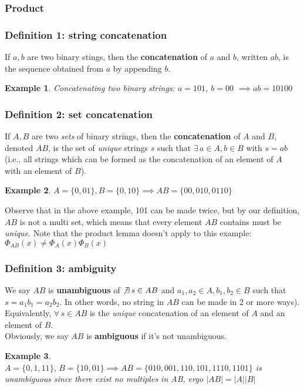 \documentclass{report}
\newtheorem{ex}{Example}[section]
\begin{document}
\subsubsection{Product}
\subsubsection{Definition 1: string concatenation}
If $a, b$ are two binary stings, then the \textbf{concatenation} of $a$ and $b$, written $ab$, is the sequence obtained from $a$ by appending $b$.
\begin{ex}
Concatenating two binary strings: $a = 101$, $b = 00$ $\implies ab = 10100$
\end{ex}
\subsubsection{Definition 2: set concatenation}
If $A, B$ are two \textit{sets} of binary strings, then the \textbf{concatenation} of $A$ and $B$, denoted $AB$, is the set of \textit{unique} strings $s$ such that $\exists\, a\in A, b \in B$ with $s = ab$ (i.e., all strings which can be formed as the concatenation of an element of $A$ with an element of $B$).
\begin{ex}
$A = \{0, 01\}, B = \{0, 10\} \implies AB = \{00, 010, 0110\}$
\end{ex}
Observe that in the above example, 101 can be made twice, but by our definition, $AB$ is not a multi set, which means that every element $AB$ contains must be \textit{unique}. Note that the product lemma doesn't apply to this example: $\Phi_{AB}(x) \neq \Phi_A(x)\Phi_B(x)$
\subsubsection{Definition 3: ambiguity}
We say $AB$ is \textbf{unambiguous} of $\not\exists \, s \in AB$ and $a_1, a_2 \in A, b_1, b_2 \in B$ such that $s = a_1b_1 = a_2b_2$. In other words, no string in $AB$ can be made in 2 or more ways).\\
Equivalently, $\forall \, s \in AB$ is the \textit{unique} concatenation of an element of $A$ and an element of $B$.\\
Obviously, we say $AB$ is \textbf{ambiguous} if it's not unambiguous.
\begin{ex}
$A = \{0, 1, 11\}, \,B=\{10, 01\} \implies AB = \{010, 001, 110, 101, 1110, 1101\}$ is unambiguous since there exist no multiples in AB, ergo $|AB| = |A||B|$
\end{ex}
\end{document}
